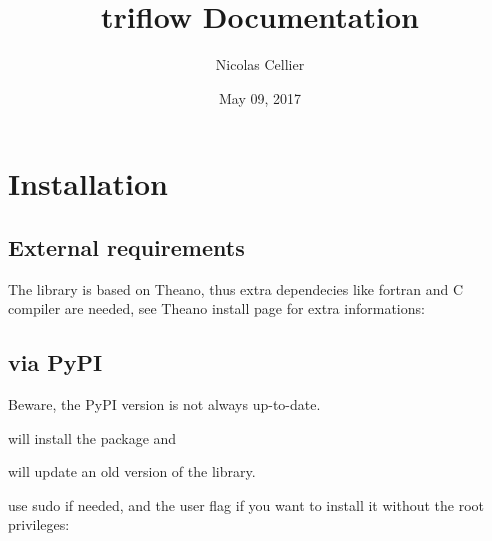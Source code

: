 \documentclass[letterpaper,10pt,english]{sphinxmanual}
\title{triflow Documentation}
\date{May 09, 2017}
\author{Nicolas Cellier}
\begin{document}
\maketitle
\sphinxtableofcontents
{}\label{\detokenize{index::doc}}



\chapter{Installation}
\label{\detokenize{installation::doc}}\label{\detokenize{installation:installation}}\label{\detokenize{installation:welcome-to-triflow-s-documentation}}

\section{External requirements}
\label{\detokenize{installation:external-requirements}}
The library is based on Theano, thus extra dependecies like fortran and C compiler are needed, see Theano install page for extra informations:



\section{via PyPI}
\label{\detokenize{installation:via-pypi}}
Beware, the PyPI version is not always up-to-date.

\begin{sphinxVerbatim}[commandchars=\\\{\}]
  
\end{sphinxVerbatim}

will install the package and

\begin{sphinxVerbatim}[commandchars=\\\{\}]
   
\end{sphinxVerbatim}

will update an old version of the library.

use sudo if needed, and the user flag if you want to install it without the root privileges:

\begin{sphinxVerbatim}[commandchars=\\\{\}]
   
\end{sphinxVerbatim}
\end{document}
